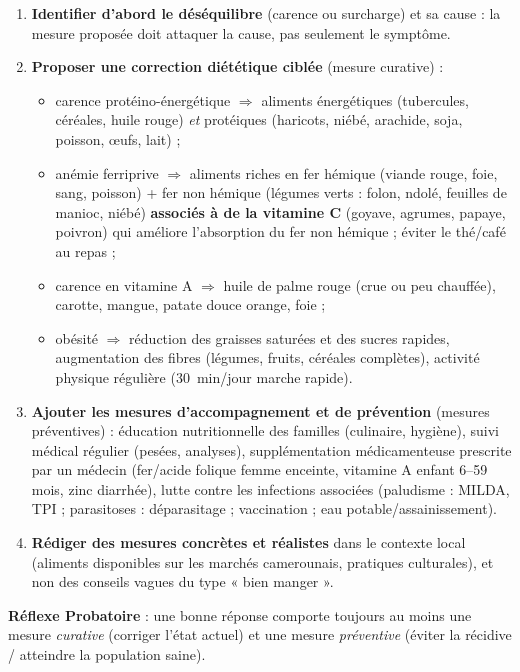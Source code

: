 \documentclass[11pt]{article}
\begin{document}
\begin{methode}
\begin{enumerate}
\item \textbf{Identifier d'abord le déséquilibre} (carence ou surcharge) et sa cause : la mesure proposée doit attaquer la cause, pas seulement le symptôme.
\item \textbf{Proposer une correction diététique ciblée} (mesure curative) :
\begin{itemize}
\item carence protéino-énergétique $\Rightarrow$ aliments énergétiques (tubercules, céréales, huile rouge) \emph{et} protéiques (haricots, niébé, arachide, soja, poisson, œufs, lait) ;
\item anémie ferriprive $\Rightarrow$ aliments riches en fer hémique (viande rouge, foie, sang, poisson) + fer non hémique (légumes verts : folon, ndolé, feuilles de manioc, niébé) \textbf{associés à de la vitamine C} (goyave, agrumes, papaye, poivron) qui améliore l'absorption du fer non hémique ; éviter le thé/café au repas ;
\item carence en vitamine A $\Rightarrow$ huile de palme rouge (crue ou peu chauffée), carotte, mangue, patate douce orange, foie ;
\item obésité $\Rightarrow$ réduction des graisses saturées et des sucres rapides, augmentation des fibres (légumes, fruits, céréales complètes), activité physique régulière (\SI{30}{min}/jour marche rapide).
\end{itemize}
\item \textbf{Ajouter les mesures d'accompagnement et de prévention} (mesures préventives) : éducation nutritionnelle des familles (culinaire, hygiène), suivi médical régulier (pesées, analyses), supplémentation médicamenteuse prescrite par un médecin (fer/acide folique femme enceinte, vitamine A enfant 6--59 mois, zinc diarrhée), lutte contre les infections associées (paludisme : MILDA, TPI ; parasitoses : déparasitage ; vaccination ; eau potable/assainissement).
\item \textbf{Rédiger des mesures concrètes et réalistes} dans le contexte local (aliments disponibles sur les marchés camerounais, pratiques culturales), et non des conseils vagues du type « bien manger ».
\end{enumerate}
\textbf{Réflexe Probatoire} : une bonne réponse comporte toujours au moins une mesure \emph{curative} (corriger l'état actuel) et une mesure \emph{préventive} (éviter la récidive / atteindre la population saine).
\end{methode}
\end{document}

